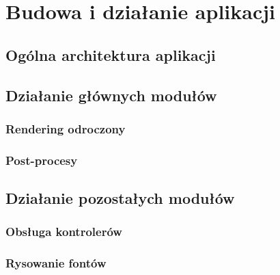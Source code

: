 \chapter{Budowa i działanie aplikacji}
\label{t:budowa}

	\section{Ogólna architektura aplikacji}
	\label{t:budowa:architektura}
	
	\section{Działanie głównych modułów}
	\label{t:budowa:rendering}
	
		\subsection{Rendering odroczony}
		\label{t:budowa:rendering:rendering}
		
		\subsection{Post-procesy}
		\label{t:budowa:rendering:postprocesy}
	
	\section{Działanie pozostałych modułów}
	\label{t:budowa:inne}
	
		\subsection{Obsługa kontrolerów}
		\label{t:budowa:inne:input}
		
		\subsection{Rysowanie fontów}
		\label{t:budowa:inne:fonty}